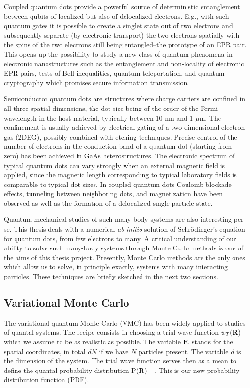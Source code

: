 Coupled quantum dots provide a powerful source of 
deterministic entanglement between qubits of localized 
but also of delocalized electrons. E.g., with such quantum gates it is
possible to create a singlet state out of two electrons 
and subsequently separate (by electronic transport) 
the two electrons spatially with the spins of the two electrons still being
entangled--the prototype of an EPR pair. 
This opens up the possibility to study a new class 
of quantum phenomena in electronic nanostructures 
such as the entanglement and
non-locality of electronic EPR pairs, tests of Bell inequalities, 
quantum teleportation, and quantum cryptography 
which promises secure information transmission. 


Semiconductor quantum dots are structures where
charge carriers are confined in all three spatial dimensions, 
the dot size being of the order of the Fermi wavelength 
in the host material, typically between  10 nm and  1 $\mu$m.
The confinement is usually achieved by electrical gating of a 
two-dimensional electron gas (2DEG), 
possibly combined with etching techniques. Precise control of the
number of electrons in the conduction band of a quantum dot 
(starting from zero) has been achieved in GaAs heterostructures. 
The electronic spectrum of typical quantum dots
can vary strongly when an external magnetic field is applied, 
since the magnetic length corresponding to typical 
laboratory fields  is comparable to typical dot sizes.
In coupled quantum dots Coulomb blockade effects, 
tunneling between neighboring dots, and magnetization 
have been observed as well as the formation of a
delocalized single-particle state. 


Quantum mechanical studies of such many-body systems are also
interesting per se. 
This thesis deals with a numerical {\em ab initio}  solution of  
Schr\"odinger's equation for quantum dots, from few electrons to many.
A critical understanding of our ability 
to solve such many-body systems through Monte Carlo methods is one 
of the aims
of this thesis project. Presently, Monte Carlo methods are
the only ones which allow us to solve, in principle exactly, 
systems with many interacting particles. These techniques are briefly sketched 
in the next two sections.


\subsection*{Variational Monte Carlo}
The variational quantum Monte Carlo (VMC) has been widely applied 
to studies of quantal systems. 
The recipe consists in choosing 
a trial wave function
$\psi_T({\bf R})$ which we assume to be as realistic as possible. 
The variable ${\bf R}$ stands for the spatial coordinates, in total 
$dN$ if we have $N$ particles present. The variable $d$ is the dimension
of the system. 
The trial wave function serves then as
a mean to define the quantal probability distribution 
\be
   P({\bf R})= .
\ee
This is our new probability distribution function  (PDF). 

